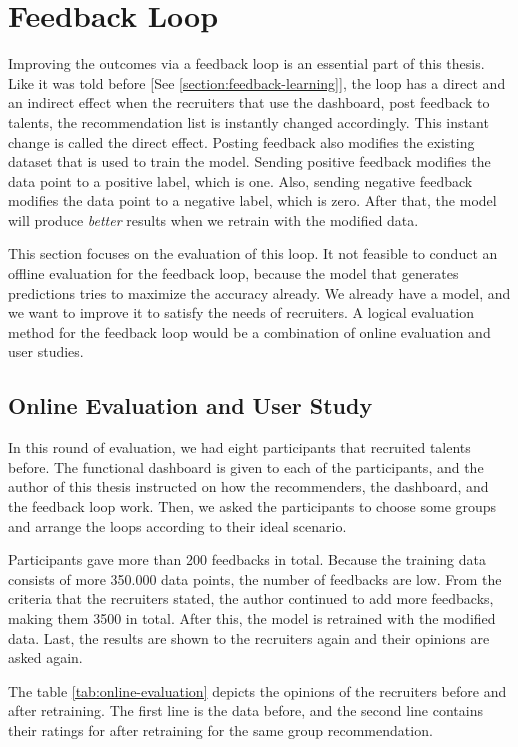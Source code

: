 \section{Feedback Loop}\label{section:eval-feedback}

Improving the outcomes via a feedback loop is an essential part of this thesis. Like it was told before [See \ref{section:feedback-learning}], the loop has a direct and an indirect effect when the recruiters that use the dashboard, post feedback to talents, the recommendation list is instantly changed accordingly. This instant change is called the direct effect. Posting feedback also modifies the existing dataset that is used to train the model. Sending positive feedback modifies the data point to a positive label, which is one. Also, sending negative feedback modifies the data point to a negative label, which is zero. After that, the model will produce \textit{better} results when we retrain with the modified data.

This section focuses on the evaluation of this loop. It not feasible to conduct an offline evaluation for the feedback loop, because the model that generates predictions tries to maximize the accuracy already. We already have a model, and we want to improve it to satisfy the needs of recruiters. A logical evaluation method for the feedback loop would be a combination of online evaluation and user studies.

\subsection{Online Evaluation and User Study}

In this round of evaluation, we had eight participants that recruited talents before. The functional dashboard is given to each of the participants, and the author of this thesis instructed on how the recommenders, the dashboard, and the feedback loop work. Then, we asked the participants to choose some groups and arrange the loops according to their ideal scenario. 

Participants gave more than 200 feedbacks in total. Because the training data consists of more 350.000 data points, the number of feedbacks are low. From the criteria that the recruiters stated, the author continued to add more feedbacks, making them 3500 in total. After this, the model is retrained with the modified data. Last, the results are shown to the recruiters again and their opinions are asked again.

The table \ref{tab:online-evaluation} depicts the opinions of the recruiters before and after retraining. The first line is the data before, and the second line contains their ratings for after retraining for the same group recommendation. 

